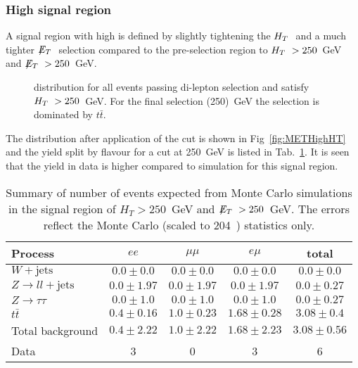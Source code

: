 \subsubsection{High \MET signal region}

A signal region with high \MET is defined by slightly tightening the $H_T~$ 
and a much tighter $\displaystyle{\not} E_T~$ selection compared to the pre-selection region
to $H_T~>250$~GeV and $\displaystyle{\not} E_T~>250$~GeV.

\begin{figure}[hbtp]
  \hfill
  \caption{\MET distribution for all events passing di-lepton selection and satisfy $H_T~> 250$~GeV. For the final \MET selection (250)~GeV the selection is dominated by $t\bar{t}$.}
\end{figure}

The \MET distribution after application of the \HT
cut is shown in Fig~\ref{fig:METHighHT} and
the yield split by flavour for a cut at 250~GeV is listed in Tab.~\ref{tab:HighMET}.
It is seen that the yield in data is higher compared 
to simulation for this signal region.

\begin{table}[htb]
\begin{center}
\caption{\label{tab:HighMET}\protect Summary of number of events expected from Monte Carlo simulations in 
the signal region of $H_T> 250$~GeV and $\displaystyle{\not} E_T~> 250$~GeV. The errors reflect the Monte Carlo (scaled
    to 204~\pbi) statistics only.}
\begin{tabular}{l|ccc|c}
\hline
Process           & $ee$       & $\mu\mu$     & $e\mu$   & total   \\
\hline\hline
$W+\textrm{jets}$ &$0.0 \pm 0.0$&$0.0 \pm 0.0$&$0.0 \pm 0.0$&$0.0 \pm 0.0$\\
$Z\rightarrow ll+\textrm{jets}$&$0.0 \pm 1.97$&$0.0 \pm 1.97$&$0.0 \pm 1.97$&$0.0 \pm 0.27$\\
$Z \rightarrow \tau\tau$&$0.0 \pm 1.0$&$0.0 \pm 1.0$&$0.0 \pm 1.0$&$0.0 \pm 0.27$\\
$t\bar{t}$&$0.4 \pm 0.16$&$1.0 \pm 0.23$&$1.68 \pm 0.28$&$3.08 \pm 0.4$\\
\hline
Total background &$0.4 \pm 2.22$&$1.0 \pm 2.22$&$1.68 \pm 2.23$&$3.08 \pm 0.56$\\
\hline
Data  & 3 & 0 & 3 & 6 \\
\hline\hline
\end{tabular}
\end{center}
\end{table}

